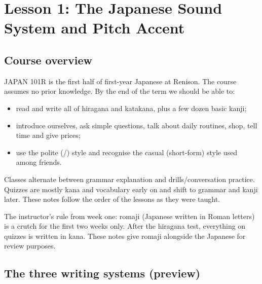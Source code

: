 \chapter{Lesson 1: The Japanese Sound System and Pitch Accent}

\section{Course overview}

JAPAN 101R is the first half of first-year Japanese at Renison. The course assumes no
prior knowledge. By the end of the term we should be able to:
\begin{itemize}
  \item read and write all of hiragana and katakana, plus a few dozen basic kanji;
  \item introduce ourselves, ask simple questions, talk about daily routines, shop,
        tell time and give prices;
  \item use the polite (/) style and recognise the casual (short-form)
        style used among friends.
\end{itemize}

Classes alternate between grammar explanation and drills/conversation practice. Quizzes
are mostly kana and vocabulary early on and shift to grammar and kanji later. These notes
follow the order of the lessons as they were taught.

\begin{aside}
The instructor's rule from week one: romaji (Japanese written in Roman letters) is a
crutch for the first two weeks only. After the hiragana test, everything on quizzes is
written in kana. These notes give romaji alongside the Japanese for review purposes.
\end{aside}

\section{The three writing systems (preview)}

